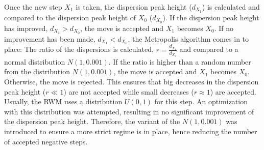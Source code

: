 Once the new step $X_{1}$ is taken, the dispersion peak height ($d_{X_{1}}$) is calculated and compared to the dispersion peak height  of $X_{0}$ ($d_{X_{0}}$). If the dispersion peak height has improved, $d_{X_{1}} > d_{X_{0}}$, the move is accepted and $X_{1}$ becomes $X_{0}$.
If no improvement has been made, $d_{X_{1}} < d_{X_{0}}$, the Metropolis algorithm comes in to place: The ratio of the dispersions is calculated, $r = \frac{d_{X_{1}}}{d_{X_{0}}}$  and compared to a normal distribution $N(1,0.001)$.
If the ratio is higher than a random number from the distribution $N(1,0.001)$, the move is accepted and $X_{1}$ becomes $X_{0}$.
Otherwise, the move is rejected.
This ensures that big decreases in the dispersion peak height ($r \ll 1$) are not accepted while small decreases ($r \approx 1$)  are accepted.
Usually, the RWM uses a distribution $U(0,1)$ for this step.
An optimization with this distribution was attempted, resulting in no significant improvement of the dispersion peak height.
Therefore, the variant of the $N(1,0.001) $ was introduced to ensure a more strict regime is in place, hence reducing the number of accepted negative steps.


